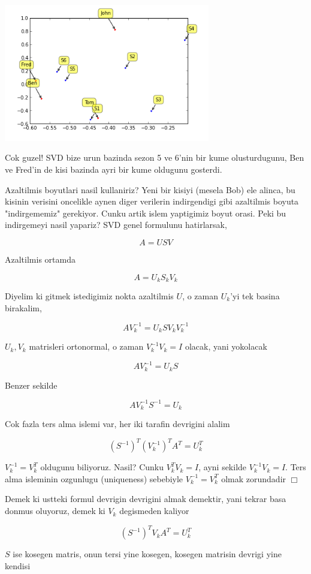 \documentclass[12pt,fleqn]{article}\usepackage{../common}
\begin{document}
\includegraphics[height=6cm]{svdrecom_1.png}

Cok guzel! SVD bize urun bazinda sezon 5 ve 6'nin bir kume
olusturdugunu, Ben ve Fred'in de kisi bazinda ayri bir kume oldugunu
gosterdi.

Azaltilmis boyutlari nasil kullaniriz? Yeni bir kisiyi (mesela Bob)
ele alinca, bu kisinin verisini oncelikle aynen diger verilerin
indirgendigi gibi azaltilmis boyuta "indirgememiz" gerekiyor. Cunku
artik islem yaptigimiz boyut orasi. Peki bu indirgemeyi nasil yapariz?
SVD genel formulunu hatirlarsak,

$$ A = USV $$

Azaltilmis ortamda

$$ A = U_k S_k V_k $$

Diyelim ki gitmek istedigimiz nokta azaltilmis $U$, o zaman $U_k$'yi tek
basina birakalim,

$$ A V_k^{-1} = U_k S V_k V_k^{-1} $$

$U_k,V_k$ matrisleri ortonormal, o zaman $V_k^{-1}V_k = I$ olacak,
yani yokolacak

$$ A V_k^{-1} = U_k S  $$

Benzer sekilde

$$  A V_k^{-1} S^{-1} = U_k $$

Cok fazla ters alma islemi var, her iki tarafin devrigini alalim

$$ (S^{-1})^T (V_k^{-1})^T A^T = U_k^T $$

$V_k^{-1} = V_k^T$ oldugunu biliyoruz. Nasil? Cunku $ V_k^TV_k = I $, ayni
sekilde $ V_k^{-1}V_k = I $. Ters alma isleminin ozgunlugu (uniqueness)
sebebiyle $V_k^{-1} = V_k^T$ olmak zorundadir $\Box$

Demek ki ustteki formul devrigin devrigini almak demektir, yani tekrar basa
donmus oluyoruz, demek ki $V_k$ degismeden kaliyor

$$ (S^{-1})^T V_k A^T = U_k^T $$

$S$ ise kosegen matris, onun tersi yine kosegen, kosegen matrisin devrigi
yine kendisi
\end{document}
